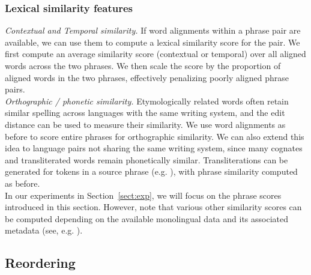 \documentclass[11pt]{article}
\newcommand{\mnote}[1]{\marginpar{%
  \vskip-\baselineskip
  \raggedright\footnotesize
  \itshape\hrule\smallskip\tiny{#1}\par\smallskip\hrule}}
\newcommand{\mtodo}[1]{\mnote{\textcolor{red}{#1}}}
\newcommand{\secref}[1]{Section~\ref{#1}}
\begin{document}
\subsubsection{Lexical similarity features}  \label{sect:lexfeats}

\noindent\emph{Contextual and Temporal similarity.}  If word alignments within a phrase pair are available, we can use them to compute a lexical similarity score for the pair.  We first compute an average similarity score (contextual or temporal) over all aligned words across the two phrases.  We then scale the score by the proportion of aligned words in the two phrases, effectively penalizing poorly aligned phrase pairs.\mtodo{Mention that it is the average of both forward and backward alignments?}\\

\noindent\emph{Orthographic / phonetic similarity.} Etymologically related words often retain similar spelling across languages with the same writing system, and the edit distance can be used to measure their similarity.  We use word alignments as before to score entire phrases for orthographic similarity.\mtodo{Not done quite the same as above but will glance over it.} We can also extend this idea to language pairs not sharing the same writing system, since many cognates and transliterated words remain phonetically similar.  Transliterations can be generated for tokens in a source phrase (e.g. \cite{Virga:2003,Irvine:2010a}), with phrase similarity computed as before.\\

In our experiments in \secref{sect:exp}, we will focus on the phrase scores introduced in this section.  However, note that various other similarity scores can be computed depending on the available monolingual data and its associated metadata (see, e.g. ).

\subsection{Reordering} \label{sect:order}
\end{document}
